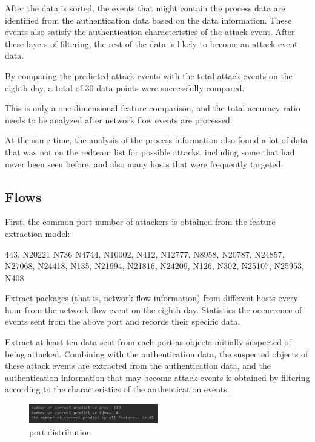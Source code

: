 \documentclass[12pt,journal,draftcls,doublespace, letterpaper,onecolumn]{IEEEtran}
\begin{document}
After the data is sorted, the events that might contain the process data are identified from the authentication data based on the data information. These events also satisfy the authentication characteristics of the attack event. After these layers of filtering, the rest of the data is likely to become an attack event data.

By comparing the predicted attack events with the total attack events on the eighth day, a total of 30 data points were successfully compared.

This is only a one-dimensional feature comparison, and the total accuracy ratio needs to be analyzed after network flow events are processed.

At the same time, the analysis of the process information also found a lot of data that was not on the redteam list for possible attacks, including some that had never been seen before, and also many hosts that were frequently targeted. 

\subsection{Flows}
First, the common port number of attackers is obtained from the feature extraction model:

443, N20221 N736 N4744, N10002, N412, N12777, N8958, N20787, N24857, N27068, N24418, N135, N21994, N21816, N24209, N126, N302, N25107, N25953, N408

Extract packages (that is, network flow information) from different hosts every hour from the network flow event on the eighth day. Statistics the occurrence of events sent from the above port and records their specific data.

Extract at least ten data sent from each port as objects initially suspected of being attacked. Combining with the authentication data, the suspected objects of these attack events are extracted from the authentication data, and the authentication information that may become attack events is obtained by filtering according to the characteristics of the authentication events.

\begin{figure}[htpb]
	\centering
	\includegraphics [width=0.5\textwidth]{12.png}
	\caption{port distribution}
	\label{fig}
\end{figure}
\end{document}
